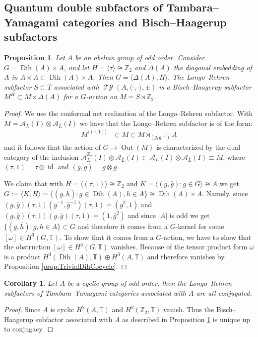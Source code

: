 \documentclass[twoside,11pt,reqno]{amsart}
\newtheorem{cor}[thm]{Corollary}
\newtheorem{prop}[thm]{Proposition}
\theoremstyle{definition}
\theoremstyle{remark}
\newcommand{\A}{\mathcal{A}}
\newcommand{\TT}{\mathbb{T}}
\newcommand{\ZZ}{\mathbb{Z}}
\DeclareMathOperator{\id}{id}
\DeclareMathOperator{\Dih}{Dih}
\DeclareMathOperator{\Out}{Out}
\DeclareMathOperator*{\TY}{\mathcal{TY}}
\newcommand{\bi}[2]{\langle #1,#2\rangle}
\newcommand{\bislotslot}{\bi\cdot\cdot}
\begin{document}
\subsection{Quantum double subfactors of Tambara--Yamagami categories and 
  Bisch--Haagerup subfactors}
\label{ssec:QuantumDoubleAndBischHaagerup}
\begin{prop}
  \label{prop:BischHaagerup}
  Let $A$ be an abelian group of odd order.
  Consider $G=\Dih(A)\times A$, and let $H=\langle \tau\rangle\cong \ZZ_2$ 
  and $\Delta(A)$ the diagonal embedding of $A$ in 
  $A\times A \subset \Dih(A)\times A$. 
  Then $G=\langle \Delta(A), H \rangle$.
  The Longo--Rehren subfactor $S\subset T$ associated with 
  $\TY(A,\bislotslot,\pm)$ is a
  Bisch--Haagerup subfactor $M^H\subset M\rtimes \Delta(A)$ for a $G$-action
  on $M=S\rtimes \ZZ_2$.
\end{prop}
\begin{proof}
  We use the conformal net realization of the Longo--Rehren subfactor.
  With $M=\A_L(I)\otimes\A_{\bar L}(I)$
  we have that the Longo--Rehren subfactor is of the form: 
  \begin{align}
    M^{\langle(\tau,1)\rangle} &\subset M \subset M\rtimes_{(g,g^{-1})} A 
  \end{align}
  and it follows that the action of $G \to \Out(M)$ is characterized by the 
  dual category of the inclusion $\A^{\ZZ_2}_L(I)\otimes\A_{\bar L}(I)
  \subset \A_L(I)\otimes\A_{\bar L}(I)\equiv M$,
  where $(\tau,1)=\tau\otimes \id $ and $(g,\bar g)=g\otimes \bar g$.

  We claim that with $H=\langle (\tau,1)\rangle\cong \ZZ_2$ and 
  $K = \langle (g,\bar g):g\in G\rangle\cong A$ we get 
  $G:=\langle K,H\rangle =\{(g,\bar h) : g\in \Dih(A), h\in A\}
    \cong \Dih(A)\times A$.
  Namely, since $(g,\bar g)(\tau,1) (g^{-1},\bar{g}^{-1}) (\tau,1) =(g^2,1)$ and
  $(g,\bar g)(\tau,1) (g,\bar{g}) (\tau,1) =(1,\bar{g}^2)$ and since $|A|$ is 
  odd we get  $\{(g,\bar h): g,h\in A\}\subset G$ and therefore it comes from a   $G$-kernel for some $[\omega]\in H^3(G,\TT)$.
  To show that it comes from a $G$-action, we have to show that the obstruction
  $[\omega]\in H^3(G,\TT)$ vanishes. 
  Because of the tensor product form $\omega$ is a product
  $H^3(\Dih(A),\TT)\oplus H^3(A,\TT)$
  and therefore vanishes by Proposition \ref{prop:TrivialDihCocycle}.
\end{proof}
\begin{cor} 
  Let $A$ be a cyclic group of odd order, then the Longo--Rehren subfactors
  of Tambara--Yamagami categories associated with $A$ are all conjugated.
\end{cor}
\begin{proof}
  Since $A$ is cyclic $H^2(A,\TT)$ and $H^2(\ZZ_2,\TT)$ vanish.
  Thus the Bisch--Haagerup subfactor associated with $A$ as 
  described in Proposition
  \ref{prop:BischHaagerup} is unique up to conjugacy. 
\end{proof}
\end{document}
